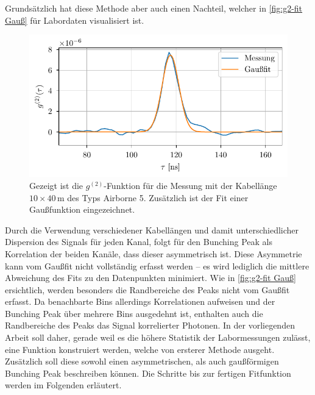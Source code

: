 Grundsätzlich hat diese Methode aber auch einen Nachteil, welcher in \autoref{fig:g2-fit Gauß} für Labordaten visualisiert ist. 
\begin{figure}[h]
    \centering
    \includegraphics{images/Analysis/g2_gaussfit.pdf}
    \caption{Gezeigt ist die $g^{(2)}$-Funktion für die Messung mit der Kabellänge $10 \times 40$\,m des Typs Airborne 5. Zusätzlich ist der Fit einer Gaußfunktion eingezeichnet.}
    \label{fig:g2-fit Gauß}
\end{figure}
Durch die Verwendung verschiedener Kabellängen und damit unterschiedlicher Dispersion des Signals für jeden Kanal, folgt für den Bunching Peak als Korrelation der beiden Kanäle, dass dieser asymmetrisch ist. 
Diese Asymmetrie kann vom Gaußfit nicht vollständig erfasst werden -- es wird lediglich die mittlere Abweichung des Fits zu den Datenpunkten minimiert. 
Wie in \autoref{fig:g2-fit Gauß} ersichtlich, werden besonders die Randbereiche des Peaks nicht vom Gaußfit erfasst. 
Da benachbarte Bins allerdings Korrelationen aufweisen und der Bunching Peak über mehrere Bins ausgedehnt ist, enthalten auch die Randbereiche des Peaks das Signal korrelierter Photonen. 
In der vorliegenden Arbeit soll daher, gerade weil es die höhere Statistik der Labormessungen zulässt, eine Funktion konstruiert werden, welche von ersterer Methode ausgeht. 
Zusätzlich soll diese sowohl einen asymmetrischen, als auch gaußförmigen Bunching Peak beschreiben können. 
Die Schritte bis zur fertigen Fitfunktion werden im Folgenden erläutert.


